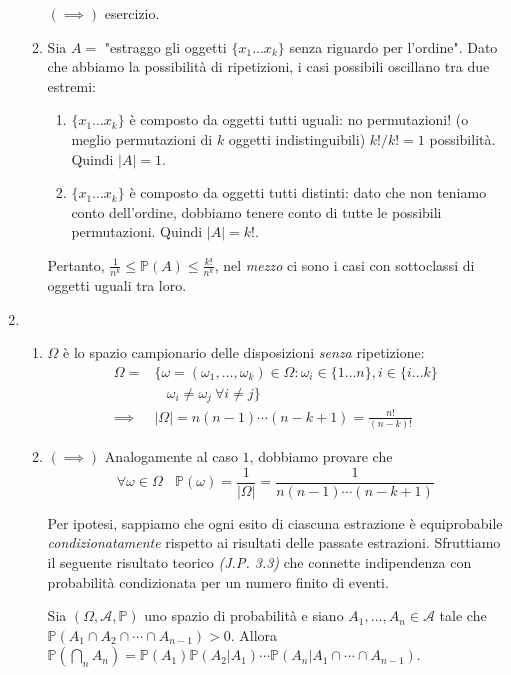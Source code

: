 \begin{enumerate}
\begin{enumerate}
$( \implies )$ esercizio.
\item Sia $A=$ "estraggo gli oggetti $\{x_{1} \dotsc x_{k}\}$ senza riguardo per l'ordine". Dato che abbiamo la possibilità di ripetizioni, i casi possibili oscillano tra due estremi:
\begin{enumerate}
\item $\{x_{1} \dotsc x_{k}\}$ è composto da oggetti tutti uguali: no permutazioni! (o meglio permutazioni di $k$ oggetti indistinguibili) $k!/k!=1$ possibilità. Quindi $| A| =1$.
\item $\{x_{1} \dotsc x_{k}\}$ è composto da oggetti tutti distinti: dato che non teniamo conto dell'ordine, dobbiamo tenere conto di tutte le possibili permutazioni. Quindi $| A| =k!$.
\end{enumerate}

Pertanto, $\frac{1}{n^{k}} \leq \mathbb{P}( A) \leq \frac{k!}{n^{k}}$, nel \textit{mezzo} ci sono i casi con sottoclassi di oggetti uguali tra loro.
\end{enumerate}
\item 
\begin{enumerate}
\item $\Omega $ è lo spazio campionario delle disposizioni \textit{senza} ripetizione:\begin{equation*}
\begin{aligned}
\Omega = & \{\omega =( \omega _{1} ,\dotsc ,\omega _{k}) \in \Omega :\omega _{i} \in \{1\dotsc n\} ,i\in \{i\dotsc k\}\\
 & \ \ \ \ \omega _{i} \neq \omega _{j} \ \forall i\neq j\}\\
\implies  & | \Omega | =n( n-1) \cdots ( n-k+1) =\frac{n!}{( n-k) !}
\end{aligned}
\end{equation*}
\item $( \implies )$ Analogamente al caso $1$, dobbiamo provare che\begin{equation*}
\forall \omega \in \Omega \ \ \ \ \mathbb{P}( \omega ) =\frac{1}{| \Omega | } =\frac{1}{n( n-1) \cdots ( n-k+1)}
\end{equation*}

Per ipotesi, sappiamo che ogni esito di ciascuna estrazione è equiprobabile \textit{condizionatamente} rispetto ai risultati delle passate estrazioni. Sfruttiamo il seguente risultato teorico \textit{(J.P. 3.3)} che connette indipendenza con probabilità condizionata per un numero finito di eventi.

Sia $( \Omega ,\mathcal{A} ,\mathbb{P})$ uno spazio di probabilità e siano $A_{1} ,\dotsc ,A_{n} \in \mathcal{A}$ tale che $\mathbb{P}( A_{1} \cap A_{2} \cap \cdots \cap A_{n-1})  >0$. Allora $\mathbb{P}\left(\bigcap _{n} A_{n}\right) =\mathbb{P}( A_{1})\mathbb{P}( A_{2} |A_{1}) \cdots \mathbb{P}( A_{n} |A_{1} \cap \cdots \cap A_{n-1})$.


\end{enumerate}
\end{enumerate}
